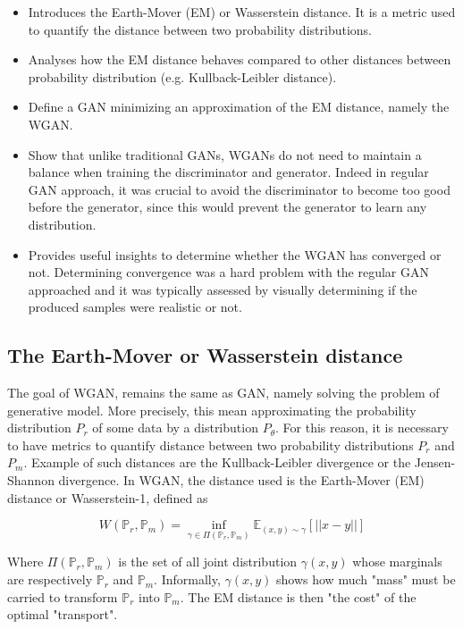 \documentclass[11pt,a4paper,twoside]{report}
\begin{document}
\begin{itemize}
    \item Introduces the Earth-Mover (EM) or Wasserstein distance. It is a metric used to quantify the distance between two probability distributions.
    \item Analyses how the EM distance behaves compared to other distances between probability distribution (e.g. Kullback-Leibler distance).
    \item Define a GAN minimizing an approximation of the EM distance, namely the WGAN.
    \item Show that unlike traditional GANs, WGANs do not need to maintain a balance when training the discriminator and generator. Indeed in regular GAN approach, it was crucial to avoid the discriminator to become too good before the generator, since this would prevent the generator to learn any distribution.
    \item Provides useful insights to determine whether the WGAN has converged or not. Determining convergence was a hard problem with the regular GAN approached and it was typically assessed by visually determining if the produced samples were realistic or not.
\end{itemize}


\subsection{The Earth-Mover or Wasserstein distance}


The goal of WGAN, remains the same as GAN, namely solving the problem of generative model. More precisely, this mean approximating the probability distribution $P_r$ of some data by a distribution $P_{\theta}$. For this reason, it is necessary to have metrics to quantify distance between two probability distributions $P_r$ and $P_m$. Example of such distances are the Kullback-Leibler divergence or the Jensen-Shannon divergence. In WGAN, the distance used is the Earth-Mover (EM) distance or Wasserstein-1, defined as 

\begin{equation}
    W(\mathbb{P}_r, \mathbb{P}_m) = \inf_{\gamma \in \Pi(\mathbb{P}_r, \mathbb{P}_m)} \mathbb{E}_{(x,y) \sim \gamma} [||x-y||]
\end{equation}

Where $\Pi(\mathbb{P}_r, \mathbb{P}_m)$ is the set of all joint distribution $\gamma(x,y)$ whose marginals are respectively $\mathbb{P}_r$ and $\mathbb{P}_m$. Informally, $\gamma(x,y)$ shows how much "mass" must be carried to transform $\mathbb{P}_r$ into $\mathbb{P}_m$. The EM distance is then "the cost" of the optimal "transport".
\end{document}
